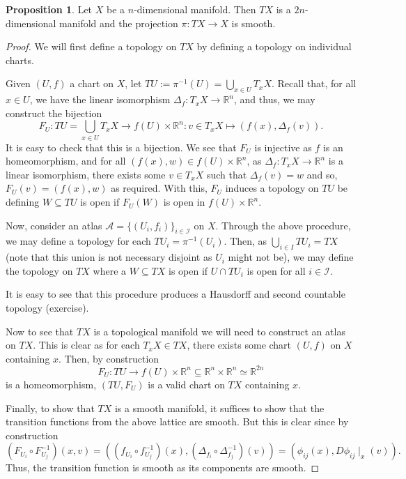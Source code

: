 \documentclass[]{article}
\theoremstyle{definition}
\theoremstyle{definition}
\newtheorem{proposition}{Proposition}[section]
\begin{document}
\begin{proposition}
  Let \(X\) be a \(n\)-dimensional manifold. Then \(TX\) is a \(2n\)-dimensional 
  manifold and the projection \(\pi : TX \to X\) is smooth.
\end{proposition}
\begin{proof}
  We will first define a topology on \(TX\) by defining a topology on individual 
  charts. 
  
  Given \((U, f)\) a chart on \(X\), 
  let \(TU := \pi^{-1}(U) = \bigcup_{x \in U} T_x X\). Recall that, for all 
  \(x \in U\), we have the linear isomorphism 
  \(\Delta_f : T_x X \to \mathbb{R}^n\), and thus, we may construct the bijection 
  \[F_U : TU = \bigcup_{x \in U} T_x X \to f(U) \times \mathbb{R}^n 
    : v \in T_x X \mapsto (f(x), \Delta_f(v)).\]
  It is easy to check that this is a bijection. We see that \(F_U\) is 
  injective as \(f\) is an homeomorphism, and for all 
  \((f(x), w) \in f(U) \times \mathbb{R}^n\), as 
  \(\Delta_f : T_x X \to \mathbb{R}^n\) is a linear isomorphism, there exists 
  some \(v \in T_x X\) such that \(\Delta_f(v) = w\) and so, 
  \(F_U(v) = (f(x), w)\) as required.
  With this, \(F_U\) induces a topology on \(TU\) be defining \(W \subseteq TU\) 
  is open if \(F_U(W)\) is open in \(f(U) \times \mathbb{R}^n\).

  Now, consider an atlas \(\mathcal{A} = \{(U_i, f_i)\}_{i \in \mathcal{I}}\) 
  on \(X\). Through the above procedure, we may define a topology for 
  each \(TU_i = \pi^{-1}(U_i)\). Then, as \(\bigcup_{i \in I} TU_i = TX\) 
  (note that this union is not necessary disjoint as \(U_i\) might not be), 
  we may define the topology on \(TX\) where a \(W \subseteq TX\) is open if 
  \(U \cap TU_i\) is open for all \(i \in \mathcal{I}\).

  It is easy to see that this procedure produces a Hausdorff and second 
  countable topology (exercise). 

  Now to see that \(TX\) is a topological manifold we will need to construct 
  an atlas on \(TX\). This is clear as for each \(T_x X \in TX\), there exists 
  some chart \((U, f)\) on \(X\) containing \(x\). Then, by construction 
  \[F_U : TU \to f(U) \times \mathbb{R}^n \subseteq 
    \mathbb{R}^n \times \mathbb{R}^n \simeq \mathbb{R}^{2n}\]
  is a homeomorphism, \((TU, F_U)\) is a valid chart on \(TX\) containing \(x\).

  Finally, to show that \(TX\) is a smooth manifold, it suffices to show 
  that the transition functions from the above lattice are smooth. But this is 
  clear since by construction
  \[(F_{U_i} \circ F_{U_j}^{-1})(x, v) = ((f_{U_i} \circ f_{U_j}^{-1})(x), 
    (\Delta_{f_i} \circ \Delta_{f_j}^{-1})(v)) = (\phi_{ij}(x), 
    D \phi_{ij}\mid_{x}(v)).\]
  Thus, the transition function is smooth as its components are smooth.


\end{proof}
\end{document}
